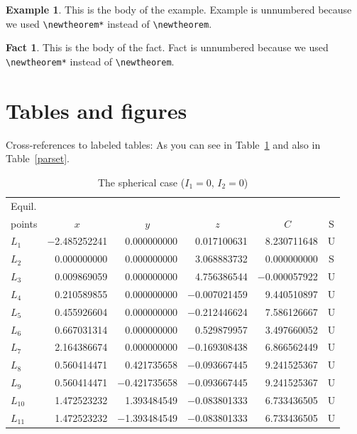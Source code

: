 \documentclass[aap]{imsart}
\theoremstyle{plain}
\theoremstyle{definition}
\newtheorem*{example}{Example}
\newtheorem*{fact}{Fact}
\begin{document}
\begin{example}
This is the body of the example. Example is unnumbered because we used \verb|\newtheorem*|
instead of \verb|\newtheorem|.
\end{example}

\begin{fact}
This is the body of the fact. Fact is unnumbered because we used \verb|\newtheorem*|
instead of \verb|\newtheorem|.
\end{fact}

\section{Tables and figures}
Cross-references to labeled tables: As you can see in Table~\ref{sphericcase}
and also in Table~\ref{parset}.

\begin{table}
\caption{The spherical case ($I_1=0$, $I_2=0$)}
\label{sphericcase}
\begin{tabular}{@{}lrrrrc@{}}
\hline
Equil. \\
points & \multicolumn{1}{c}{$x$}
& \multicolumn{1}{c}{$y$} & \multicolumn{1}{c}{$z$}
& \multicolumn{1}{c}{$C$} & S \\
\hline
$L_1$    & $-$2.485252241 & 0.000000000  & 0.017100631  & 8.230711648  & U \\
$L_2$    & 0.000000000  & 0.000000000  & 3.068883732  & 0.000000000  & S \\
$L_3$    & 0.009869059  & 0.000000000  & 4.756386544  & $-$0.000057922 & U \\
$L_4$    & 0.210589855  & 0.000000000  & $-$0.007021459 & 9.440510897  & U \\
$L_5$    & 0.455926604  & 0.000000000  & $-$0.212446624 & 7.586126667  & U \\
$L_6$    & 0.667031314  & 0.000000000  & 0.529879957  & 3.497660052  & U \\
$L_7$    & 2.164386674  & 0.000000000  & $-$0.169308438 & 6.866562449  & U \\
$L_8$    & 0.560414471  & 0.421735658  & $-$0.093667445 & 9.241525367  & U \\
$L_9$    & 0.560414471  & $-$0.421735658 & $-$0.093667445 & 9.241525367  & U \\
$L_{10}$ & 1.472523232  & 1.393484549  & $-$0.083801333 & 6.733436505  & U \\
$L_{11}$ & 1.472523232  & $-$1.393484549 & $-$0.083801333 & 6.733436505  & U \\
\hline
\end{tabular}
\end{table}
\end{document}
